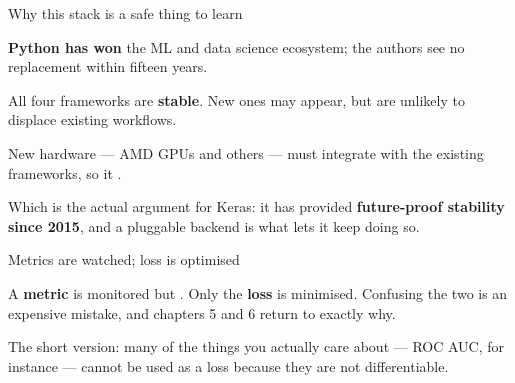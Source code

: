 \documentclass[aspectratio=169,11pt,t]{beamer}
\begin{document}
\begin{frame}[shrink=25]{Why this stack is a safe thing to learn}
\begin{ibullets}
\item \textbf{Python has won} the ML and data science ecosystem; the authors see no replacement within fifteen years.
\item All four frameworks are \textbf{stable}. New ones may appear, but are unlikely to displace existing workflows.
\item New hardware --- AMD GPUs and others --- must integrate with the existing frameworks, so it .
\end{ibullets}
\begin{iband}[signal]
Which is the actual argument for Keras: it has provided \textbf{future-proof stability since 2015}, and a pluggable backend is what lets it keep doing so.
\end{iband}
\end{frame}

\begin{frame}[shrink=25]{Metrics are watched; loss is optimised}
\begin{iband}[amber]
A \textbf{metric} is monitored but . Only the \textbf{loss} is minimised. Confusing the two is an expensive mistake, and chapters 5 and 6 return to exactly why.
\end{iband}
{\fontsize{9.4}{12.6}\selectfont\color{fg2}The short version: many of the things you actually care about --- ROC AUC, for instance --- cannot be used as a loss because they are not differentiable.\par}\vskip 4pt
\end{frame}
\end{document}
